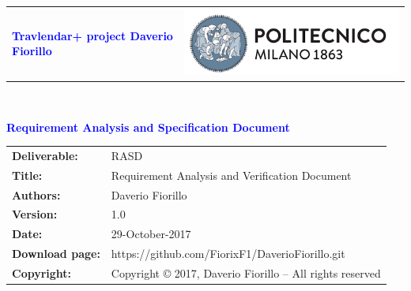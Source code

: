 




\begin{titlepage}



{\begin{table}[t!]
\centering
\begin{tabu} to \textwidth { X[1.3,r,p] X[1.7,l,p] }
\textcolor{Blue}
{\textbf{\small{Travlendar+ project Daverio Fiorillo}}} & \includegraphics[scale=0.5]{Images/PolimiLogo}
\end{tabu}
\end{table}}~\\ [7cm]


\begin{flushleft}

{\textcolor{Blue}{\textbf{\Huge{Requirement Analysis and Specification
        Document}}}} \\ [1cm]

\end{flushleft}

\end{titlepage}

\begin{table}[h!]
\begin{tabu} to \textwidth { X[0.3,r,p] X[0.7,l,p] }
\hline

\textbf{Deliverable:} & RASD\\
\textbf{Title:} & Requirement Analysis and Verification Document \\
\textbf{Authors:} & Daverio Fiorillo \\
\textbf{Version:} & 1.0 \\ 
\textbf{Date:} & 29-October-2017 \\
\textbf{Download page:} & https://github.com/FiorixF1/DaverioFiorillo.git \\
\textbf{Copyright:} & Copyright © 2017, Daverio Fiorillo – All rights reserved \\
\hline
\end{tabu}
\end{table}




